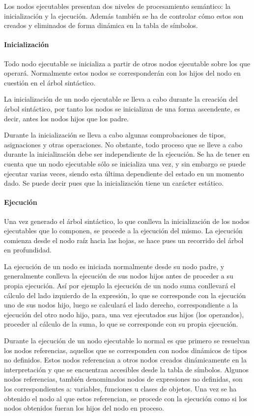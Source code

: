 Los nodos ejecutables presentan dos niveles de procesamiento semántico: la inicialización y la ejecución. Además también se ha de controlar cómo estos son creados y eliminados de 
forma dinámica en la tabla de símbolos. 



\paragraph{Inicialización}
Todo nodo ejecutable se inicializa a partir de otros nodos ejecutable sobre los que operará. Normalmente estos nodos se corresponderán con los hijos del nodo en cuestión en el árbol sintáctico. 

La inicialización de un nodo ejecutable se lleva a cabo durante la creación del árbol sintáctico, por tanto los nodos se inicializan de una forma ascendente, es decir,
antes los nodos hijos que los padre.

Durante la inicialización se lleva a cabo algunas comprobaciones de tipos, asignaciones y otras operaciones. No obstante, todo proceso que se lleve a cabo durante la
inicialización debe ser independiente de la ejecución. Se ha de tener en cuenta que un nodo ejecutable sólo se inicializa una vez, y sin embargo se puede ejecutar varias
veces, siendo esta última dependiente del estado en un momento dado. Se puede decir pues que la inicialización tiene un carácter estático.

\paragraph{Ejecución}
Una vez generado el árbol sintáctico, lo que conlleva la inicialización de los nodos ejecutables que lo componen, se procede a la ejecución del mismo. La ejecución comienza desde el 
nodo raíz hacia las hojas, se hace pues un recorrido del árbol en profundidad.

La ejecución de un nodo es iniciada normalmente desde su nodo padre, y generalmente conlleva la ejecución de sus nodos hijos antes de proceder a su propia ejecución. Así por ejemplo 
la ejecución de un nodo suma conllevará el cálculo del lado izquierdo de la expresión, lo que se corresponde con la ejecución uno de sus nodos hijo, luego se calculará
el lado derecho, correspondiente a la ejecución del otro nodo hijo, para, una vez ejecutados sus hijos (los operandos), proceder al cálculo de la suma, lo que se corresponde 
con su propia ejecución. 

Durante la ejecución de un nodo ejecutable lo normal es que primero se resuelvan los nodos referencias, aquellos que se corresponden con nodos dinámicos de tipos no definidos. Estos 
nodos referencian a otros nodos creados dinámicamente en la interpretación y que se encuentran accesibles desde la tabla de símbolos. Algunos nodos referencias, 
también denominados nodos de expresiones no definidas, son los correspondientes a: variables, funciones u clases de objetos. Una vez se ha obtenido el nodo al que estos referencian, 
se procede con la ejecución como si los nodos obtenidos fueran los hijos del nodo en proceso.


